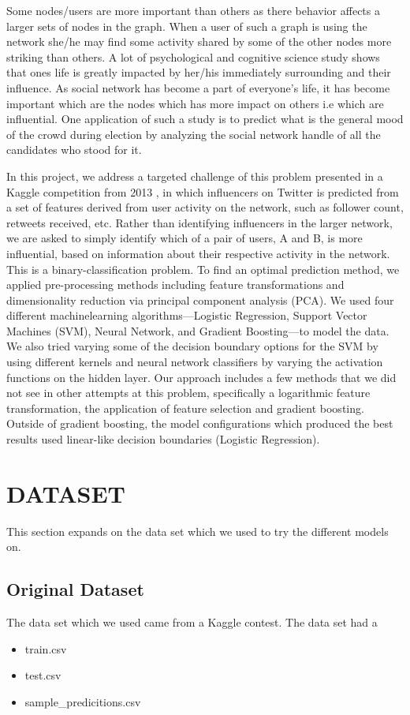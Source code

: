 \documentclass[conference]{IEEEtran}
\numberwithin{equation}{section}
\numberwithin{figure}{section}
\numberwithin{table}{section}
\begin{document}
Some nodes/users are more important than others as there behavior affects a larger sets of nodes in the graph. When a user of such a graph is using the network she/he may find some activity shared by some of the other nodes more striking than others. A lot of psychological and cognitive science study shows that ones life is greatly impacted by her/his immediately surrounding and their influence. As social network has become a part of everyone's life, it has become important which are the nodes which has more impact on others i.e which are influential. One application of such a study is to predict what is the general mood of the crowd during election by analyzing the social network handle of all the candidates who stood for it. 

In this project, we address a targeted challenge of this problem presented in a Kaggle\cite{kaggle} competition from 2013 , in which influencers on Twitter is predicted from a set of features derived from user activity on the network, such as follower count, retweets received, etc. Rather than identifying influencers in the larger network, we are asked to simply identify which of a pair of users, A and B, is more influential, based on information about their respective activity in the network. This is a binary-classification problem. To find an optimal prediction method, we applied pre-processing methods including feature transformations and dimensionality reduction via principal component analysis (PCA). We used four different machinelearning algorithms—Logistic Regression, Support Vector Machines (SVM), Neural Network, and Gradient Boosting—to model the data. We also tried varying some of the decision boundary options for the SVM by using different kernels and neural network classifiers by varying the activation functions on the hidden layer. Our approach includes a few methods that we did not see in other attempts at this problem, specifically a logarithmic feature transformation, the application of feature selection and gradient boosting. Outside of gradient boosting, the model configurations which produced the best results used linear-like decision boundaries (Logistic Regression).
 
\section{DATASET}\label{sec:page-layout}

This section expands on the data set which we used to try the different models on. 


\subsection{Original Dataset}\label{sec:formatting}
The data set which we used came from a Kaggle contest. The data set had a 
\begin{itemize}
  \item train.csv
  \item test.csv
  \item sample\_predicitions.csv
\end{itemize}
\end{document}
